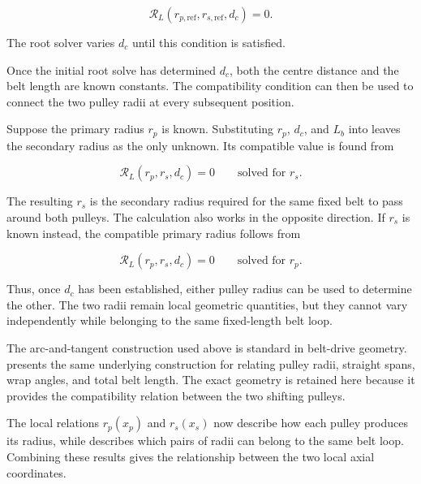 \documentclass[11pt]{report}
\numberwithin{equation}{section}
\begin{document}
\begin{equation}
    \mathcal{R}_L
    \left(
        r_{p,\mathrm{ref}},
        r_{s,\mathrm{ref}},
        d_c
    \right)
    =0.
    \label{eq:center_distance_root}
\end{equation}

The root solver varies \(d_c\) until this condition is satisfied.

Once the initial root solve has determined \(d_c\), both the centre distance and
the belt length are known constants. The compatibility condition can then be
used to connect the two pulley radii at every subsequent position.

Suppose the primary radius \(r_p\) is known. Substituting \(r_p\), \(d_c\), and
\(L_b\) into  leaves the secondary radius as the
only unknown. Its compatible value is found from

\begin{equation}
    \mathcal{R}_L(r_p,r_s,d_c)=0
    \qquad
    \text{solved for } r_s.
    \label{eq:secondary_radius_compatibility}
\end{equation}

The resulting \(r_s\) is the secondary radius required for the same fixed
belt to pass around both pulleys. The calculation also works in the opposite
direction. If \(r_s\) is known instead, the compatible primary radius follows
from

\begin{equation}
    \mathcal{R}_L(r_p,r_s,d_c)=0
    \qquad
    \text{solved for } r_p.
    \label{eq:primary_radius_compatibility}
\end{equation}

Thus, once \(d_c\) has been established, either pulley radius can be used to
determine the other. The two radii remain local geometric quantities, but
they cannot vary independently while belonging to the same fixed-length belt
loop.

The arc-and-tangent construction used above is standard in belt-drive
geometry. \citet{BudynasNisbett2015} presents the same underlying construction
for relating pulley radii, straight spans, wrap angles, and total belt length.
The exact geometry is retained here because it provides the compatibility
relation between the two shifting pulleys.

The local relations \(r_p(x_p)\) and \(r_s(x_s)\) now describe how each
pulley produces its radius, while
 describes which pairs of radii can belong
to the same belt loop. Combining these results gives the relationship between
the two local axial coordinates.
\end{document}

